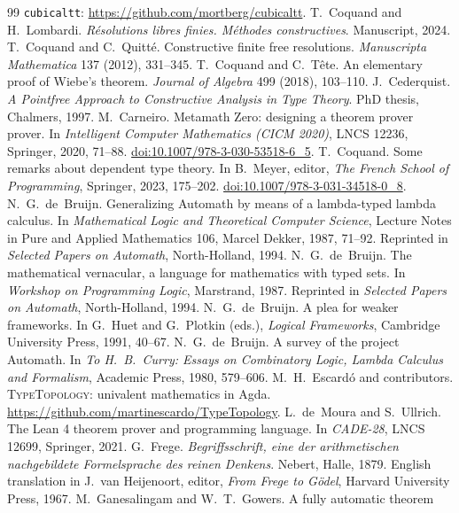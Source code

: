 \documentclass[11pt]{article}
\begin{document}
\begin{thebibliography}{99}
  \texttt{cubicaltt}: \url{https://github.com/mortberg/cubicaltt}.
 T.~Coquand and H.~Lombardi. \emph{R\'esolutions libres
  finies. M\'ethodes constructives}. Manuscript, 2024.
 T.~Coquand and C.~Quitt\'e. Constructive finite free
  resolutions. \emph{Manuscripta Mathematica} 137 (2012), 331--345.
 T.~Coquand and C.~T\^ete. An elementary proof of Wiebe's
  theorem. \emph{Journal of Algebra} 499 (2018), 103--110.
 J.~Cederquist. \emph{A Pointfree Approach to Constructive
  Analysis in Type Theory}. PhD thesis, Chalmers, 1997.
 M.~Carneiro. Metamath Zero: designing a theorem prover
  prover. In \emph{Intelligent Computer Mathematics (CICM 2020)},
  LNCS 12236, Springer, 2020, 71--88.
  \href{https://doi.org/10.1007/978-3-030-53518-6_5}{doi:10.1007/978-3-030-53518-6\_5}.
 T.~Coquand. Some remarks about dependent type theory. In
  B.~Meyer, editor, \emph{The French School of Programming}, Springer,
  2023, 175--202.
  \href{https://doi.org/10.1007/978-3-031-34518-0_8}{doi:10.1007/978-3-031-34518-0\_8}.
 N.~G.~de~Bruijn. Generalizing Automath by means of a
  lambda-typed lambda calculus. In \emph{Mathematical Logic and
  Theoretical Computer Science}, Lecture Notes in Pure and Applied
  Mathematics 106, Marcel Dekker, 1987, 71--92. Reprinted in
  \emph{Selected Papers on Automath}, North-Holland, 1994.
 N.~G.~de~Bruijn. The mathematical vernacular, a language
  for mathematics with typed sets. In \emph{Workshop on Programming
  Logic}, Marstrand, 1987. Reprinted in \emph{Selected Papers on
  Automath}, North-Holland, 1994.
 N.~G.~de~Bruijn. A plea for weaker frameworks. In
  G.~Huet and G.~Plotkin (eds.), \emph{Logical Frameworks}, Cambridge
  University Press, 1991, 40--67.
 N.~G.~de~Bruijn. A survey of the project Automath. In
  \emph{To H.~B.~Curry: Essays on Combinatory Logic, Lambda Calculus and
  Formalism}, Academic Press, 1980, 579--606.
 M.~H.~Escard\'o and contributors. \textsc{TypeTopology}: univalent mathematics in Agda.
  \url{https://github.com/martinescardo/TypeTopology}.
 L.~de~Moura and S.~Ullrich. The Lean 4 theorem prover and
  programming language. In \emph{CADE-28}, LNCS 12699, Springer, 2021.
 G.~Frege. \emph{Begriffsschrift, eine der arithmetischen
  nachgebildete Formelsprache des reinen Denkens}. Nebert, Halle, 1879.
  English translation in J.~van Heijenoort, editor, \emph{From Frege to
  G\"odel}, Harvard University Press, 1967.
 M.~Ganesalingam and W.~T.~Gowers. A fully automatic theorem

\end{thebibliography}
\end{document}
